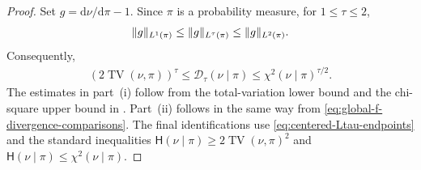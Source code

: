 \documentclass[11pt,reqno]{amsart}
\numberwithin{equation}{section}
\theoremstyle{plain}
\theoremstyle{remark}
\DeclarePairedDelimiter{\norm}{\lVert}{\rVert}
\newcommand{\md}{\mathrm{d}}
\newcommand{\Hr}{{\mathsf{H}}}
\newcommand{\Chi}{\chi^2}
\newcommand{\TV}{\operatorname{TV}}
\begin{document}
\begin{proof}
Set \(g=\md\nu/\md\pi-1\).  Since \(\pi\) is a probability measure, for \(1\le\tau\le2\),
\begin{align}\label{eq:L1-Ltau-L2-comparison}
 \norm{g}_{L^1(\pi)}
 \le \norm{g}_{L^\tau(\pi)}
 \le \norm{g}_{L^2(\pi)}.
\end{align}
Consequently,
\begin{align}\label{eq:centered-Ltau-endpoint-comparison}
 \left(2\TV(\nu,\pi)\right)^\tau
 \le \mathscr D_\tau(\nu\mid\pi)
 \le \Chi(\nu\mid\pi)^{\tau/2}.
\end{align}
The estimates in part~\textup{(i)} follow from the total-variation lower bound and the chi-square upper bound in .  Part~\textup{(ii)} follows in the same way from \eqref{eq:global-f-divergence-comparisons}.  The final identifications use \eqref{eq:centered-Ltau-endpoints} and the standard inequalities \(\Hr(\nu\mid\pi)\ge2\TV(\nu,\pi)^2\) and \(\Hr(\nu\mid\pi)\le\Chi(\nu\mid\pi)\).
\end{proof}
\end{document}
